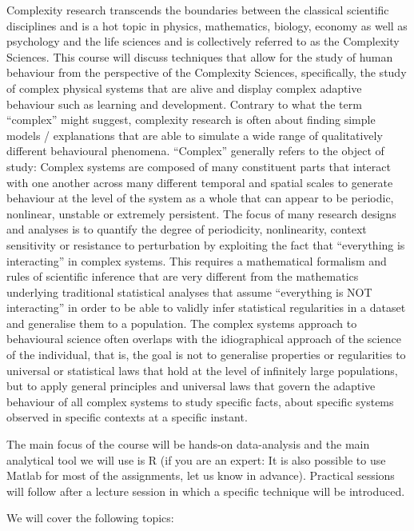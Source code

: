 \documentclass[12pt,]{book}
\theoremstyle{definition}
\theoremstyle{definition}
\theoremstyle{definition}
\theoremstyle{remark}
\begin{document}
Complexity research transcends the boundaries between the classical
scientific disciplines and is a hot topic in physics, mathematics,
biology, economy as well as psychology and the life sciences and is
collectively referred to as the Complexity Sciences. This course will
discuss techniques that allow for the study of human behaviour from the
perspective of the Complexity Sciences, specifically, the study of
complex physical systems that are alive and display complex adaptive
behaviour such as learning and development. Contrary to what the term
``complex'' might suggest, complexity research is often about finding
simple models / explanations that are able to simulate a wide range of
qualitatively different behavioural phenomena. ``Complex'' generally
refers to the object of study: Complex systems are composed of many
constituent parts that interact with one another across many different
temporal and spatial scales to generate behaviour at the level of the
system as a whole that can appear to be periodic, nonlinear, unstable or
extremely persistent. The focus of many research designs and analyses is
to quantify the degree of periodicity, nonlinearity, context sensitivity
or resistance to perturbation by exploiting the fact that ``everything
is interacting'' in complex systems. This requires a mathematical
formalism and rules of scientific inference that are very different from
the mathematics underlying traditional statistical analyses that assume
``everything is NOT interacting'' in order to be able to validly infer
statistical regularities in a dataset and generalise them to a
population. The complex systems approach to behavioural science often
overlaps with the idiographical approach of the science of the
individual, that is, the goal is not to generalise properties or
regularities to universal or statistical laws that hold at the level of
infinitely large populations, but to apply general principles and
universal laws that govern the adaptive behaviour of all complex systems
to study specific facts, about specific systems observed in specific
contexts at a specific instant.

The main focus of the course will be hands-on data-analysis and the main
analytical tool we will use is R (if you are an expert: It is also
possible to use Matlab for most of the assignments, let us know in
advance). Practical sessions will follow after a lecture session in
which a specific technique will be introduced.

We will cover the following topics:
\end{document}
